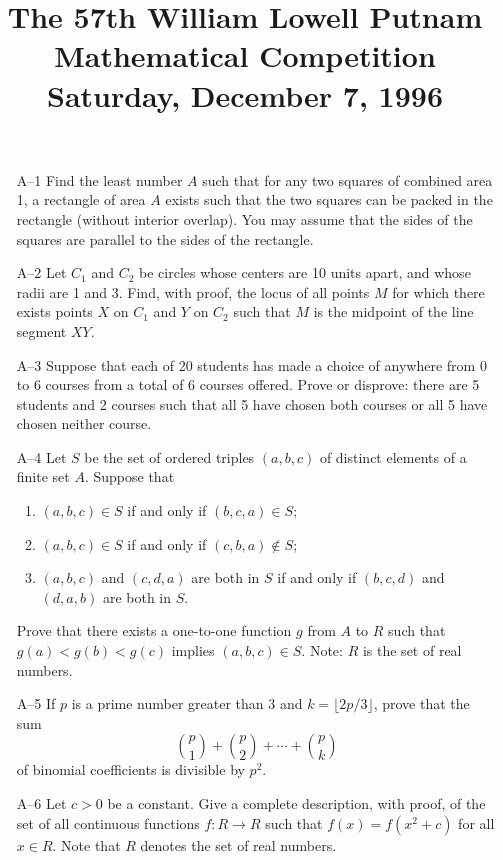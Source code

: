 \documentclass[amssymb,twocolumn,pra,10pt,aps]{revtex4-1}
\begin{document}
\title{The 57th William Lowell Putnam Mathematical Competition \\
    Saturday, December 7, 1996}
\maketitle

\begin{itemize}
\item[A--1]
Find the least number $A$ such that for any two squares of combined
area 1, a rectangle of area $A$ exists such that the two squares can
be packed in the rectangle (without interior overlap). You may assume
that the sides of the squares are parallel to the sides of the
rectangle.

\item[A--2]
Let $C_1$ and $C_2$ be circles whose centers are 10 units apart, and
whose radii are 1 and 3. Find, with proof, the locus of all points $M$
for which there exists points $X$ on $C_1$ and $Y$ on $C_2$ such that
$M$ is the midpoint of the line segment $XY$.

\item[A--3]
Suppose that each of 20 students has made a choice of anywhere from 0
to 6 courses from a total of 6 courses offered. Prove or disprove:
there are 5 students and 2 courses such that all 5 have chosen both
courses or all 5 have chosen neither course.

\item[A--4]
Let $S$ be the set of ordered triples $(a, b, c)$ of distinct elements
of a finite set $A$. Suppose that
\begin{enumerate}
\item $(a,b,c) \in S$ if and only if $(b,c,a) \in S$;
\item $(a,b,c) \in S$ if and only if $(c,b,a) \notin S$;
\item $(a,b,c)$ and $(c,d,a)$ are both in $S$ if and only if $(b,c,d)$
and $(d,a,b)$ are both in $S$.
\end{enumerate}
Prove that there exists a one-to-one function $g$ from $A$ to $R$ such
that $g(a) < g(b) < g(c)$ implies $(a,b,c) \in S$. Note: $R$ is the
set of real numbers.

\item[A--5]
If $p$ is a prime number greater than 3 and $k = \lfloor 2p/3
\rfloor$, prove that the sum
\[
\binom p1 + \binom p2 + \cdots + \binom pk
\]
of binomial coefficients is divisible by $p^2$.

\item[A--6]
Let $c>0$ be a constant. Give a complete description, with proof, of
the set of all continuous functions $f: R \to R$ such that $f(x) =
f(x^2+c)$ for all $x \in R$. Note that $R$ denotes the set of real numbers.


\end{itemize}
\end{document}
